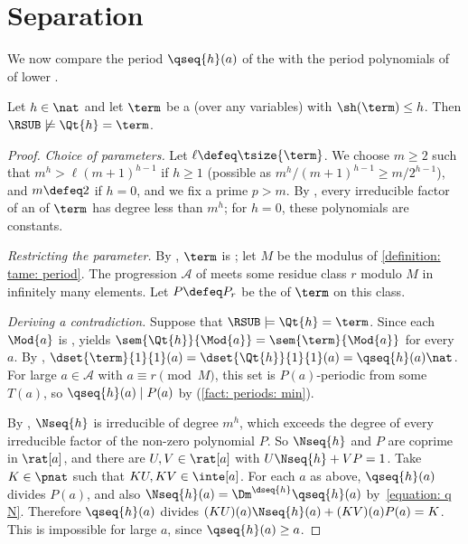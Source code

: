 \section{Separation}\label{section: separation}

We now compare the period $\qseq{h}(a)$ of the  with the period polynomials of  of lower .
\begin{theorem}\label{theorem: main RSUB}
    Let $h \in \nat$ and let $\term$ be a  (over any variables) with $\sh(\term) \le h$.
    Then $\RSUB \not\models \Qt{h} = \term$.
\end{theorem}
\begin{proof}
    \emph{Choice of parameters.}
    Let $\ell \defeq \tsize{\term}$.
    We choose $m \ge 2$ such that $m^{h} > \ell (m+1)^{h-1}$ if $h \ge 1$ (possible as $m^h / (m+1)^{h-1} \ge m / 2^{h-1}$), and $m \defeq 2$ if $h = 0$, and we fix a prime $p > m$.
    By , every irreducible factor of an  of $\term$ has degree less than $m^{h}$; for $h = 0$, these polynomials are constants.

    \emph{Restricting the parameter.}
    By , $\term$ is ; let $M$ be the modulus of \cref{definition: tame: period}.
    The progression $\mathcal{A}$ of  meets some residue class $r$ modulo $M$ in infinitely many elements.
    Let $P \defeq P_{r}$ be the  of $\term$ on this class.

    \emph{Deriving a contradiction.}
    Suppose that $\RSUB \models \Qt{h} = \term$.
    Since each $\Mod{a}$ is ,  yields $\sem{\Qt{h}}{\Mod{a}} = \sem{\term}{\Mod{a}}$ for every $a$.
    By , $\dset{\term}{1}{1}(a) = \dset{\Qt{h}}{1}{1}(a) = \qseq{h}(a) \nat$.
    For large $a \in \mathcal{A}$ with $a \equiv r \pmod M$, this set is $P(a)$-periodic from some $T(a)$, so $\qseq{h}(a) \mid P(a)$ by (\ref{fact: periods: min}).

    By , $\Nseq{h}$ is irreducible of degree $m^{h}$, which exceeds the degree of every irreducible factor of the non-zero polynomial $P$.
    So $\Nseq{h}$ and $P$ are coprime in $\rat[a]$, and there are $U, V \in \rat[a]$ with $U \Nseq{h} + V P = 1$.
    Take $K \in \pnat$ such that $K U, K V \in \inte[a]$.
    For each $a$ as above, $\qseq{h}(a)$ divides $P(a)$, and also $\Nseq{h}(a) = \Dm^{\dseq{h}} \qseq{h}(a)$ by~\eqref{equation: q N}.
    Therefore $\qseq{h}(a)$ divides $(K U)(a) \Nseq{h}(a) + (K V)(a) P(a) = K$.
    This is impossible for large $a$, since $\qseq{h}(a) \ge a$.
\end{proof}

